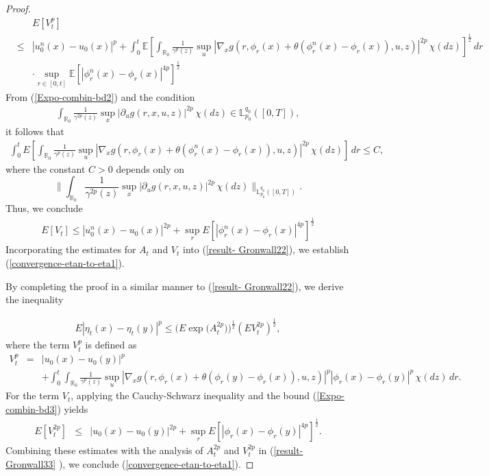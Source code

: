 \documentclass[12pt,oneside, reqno]{amsart}
\newcommand{\be}{\begin{eqnarray}}
\newcommand{\ee}{\end{eqnarray}}
\newcommand{\ce}{\begin{eqnarray*}}
\newcommand{\de}{\end{eqnarray*}}
\def\mE{{\mathbb E}}
\def\mL{{\mathbb L}}
\def\mR{{\mathbb R}}
\def\leq{\leqslant}
\numberwithin{equation}{section}
\begin{document}
\begin{proof}
\ce 
&&E[V_t^p]\\
&\leq &|u_0^n(x)-u_0(x)|^{p}+\int_0^t\mE\left[\int_{\mR_0}\frac{1}{\gamma^{p}(z)} \sup_u|\nabla_x g(r,\phi_{r}(x)+\theta (\phi_{r}^n(x)-\phi_{r}(x)),u,z)|^{2p}\,\chi(dz)\right]^{\frac{1}{2}}\,dr\\
&&\cdot\sup_{r\in[0,t]}\mE[|\phi_{r}^n(x)-\phi_{r}(x)|^{4p}]^{\frac{1}{2}}
\de 
From (\ref{Expo-combin-bd2}) and  the condition
\ce 
\int_{\mR_0}\frac{1}{\gamma^{2p}(z)} \sup_x|\partial_u g(r,x,u,z)|^{2p}\,\chi(dz)\in \mL_{p_0}^{q_0}([0,T]), 
\de
it follows that
\ce
\int_0^tE\left[\int_{\mR_0}\frac{1}{\gamma^{p}(z)} \sup_u|\nabla_x g(r,\phi_{r}(x)+\theta (\phi_{r}^n(x)-\phi_{r}(x)),u,z)|^{2p}\,\chi(dz)\right]\,dr \leq C,
\de 
where the constant $C>0$ depends only on  $$\|\int_{\mR_0}\frac{1}{\gamma^{2p}(z)} \sup_x|\partial_u g(r,x,u,z)|^{2p}\,\chi(dz)\|_{\mL_{p_0}^{q_0}([0,T])}.$$  Thus, we conclude
\ce 
E[V_t]\leq |u_0^n(x)-u_0(x)|^{2p}+\sup_r E\left[|\phi_{r}^n(x)-\phi_{r}(x)|^{4p}\right]^{\frac{1}{2}}
\de 
Incorporating the estimates for $A_t$ and $V_t$ into (\ref{result- Gronwall22}), we establish (\ref{convergence-etan-to-eta1}).

By completing the proof in a similar manner to (\ref{result- Gronwall22}), we derive the inequality

\be\label{result- Gronwall33} 
E |\eta_t(x)-\eta_t(y)|^p \leq \bigg(E \exp\big(A_t^{2p}\big)\bigg)^{\frac{1}{2}}(E V_{t}^{2p})^{\frac{1}{2}},
\ee 	
where the term $V_t^p$ is defined as
	\ce 
	V_t^p&=&|u_0(x)-u_0(y)|^{p}\\
	&&+\int_0^t\int_{\mR_0}\frac{1}{\gamma^{p}(z)} \sup_u|\nabla_x g(r,\phi_{r}(x)+\theta (\phi_{r}(y)-\phi_{r}(x)),u,z)|^{p}|\phi_{r}(x)-\phi_{r}(y)|^{p}\,\chi(dz)\,dr.
	\de 	
	For the term $V_t$, applying the Cauchy-Schwarz inequality and the bound  (\ref{Expo-combin-bd3}) yields
	\ce 
	E[V_t^{2p}]&\leq &|u_0(x)-u_0(y)|^{2p}+ \sup_r E\left[|\phi_{r}(x)-\phi_{r}(y)|^{4p}\right]^{\frac{1}{2}}.
	\de 
	Combining these estimates with the analysis of  $A_t^{2p}$	and $V_t^{2p}$	in (\ref{result- Gronwall33} ), we conclude (\ref{convergence-etan-to-eta1}).
	\end{proof}	
\end{document}
